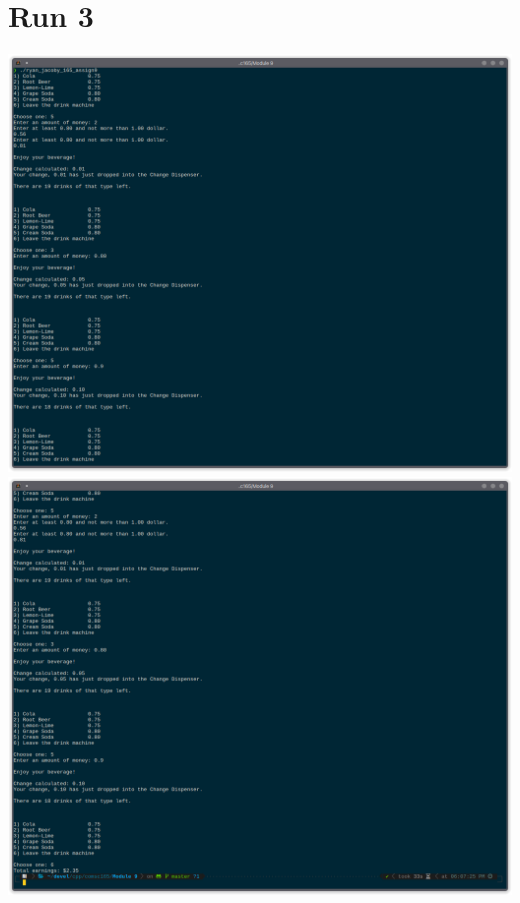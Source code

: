 \documentclass[letterpaper, 11pt]{article}
\begin{document}
\section*{Run 3}
\includegraphics[scale=0.5]{run3_1.png}
\clearpage
\includegraphics[scale=0.5]{run3_2.png}
\clearpage
\end{document}
